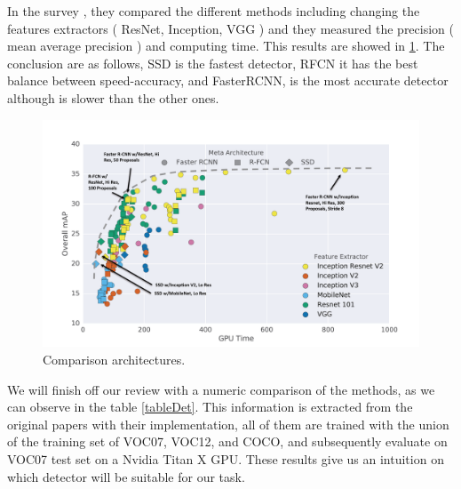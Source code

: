 In the survey \cite{cnnComparision}, they compared the different methods including changing the features extractors ( ResNet, Inception, VGG ) and they measured the precision ( mean average precision ) and computing time. This results are showed in \ref{comparisio}. The conclusion are as follows, SSD is the fastest detector, RFCN it has the best balance between speed-accuracy, and FasterRCNN, is the most accurate detector although is slower than the other ones.



\begin{figure}[H]
\centering         
\includegraphics[width=0.9\linewidth]{objectDetection/comparisionTensor.png}
\caption{Comparison architectures.} \label{comparisio}
\end{figure}

We will finish off our review with a numeric comparison of the methods, as we can observe in the table \ref{tableDet}. This information is extracted from the original papers with their implementation, all of them are trained with the union of the training set of VOC07, VOC12, and COCO, and subsequently evaluate on VOC07 test set on a Nvidia Titan X GPU. These results give us an intuition on which detector will be suitable for our task.

